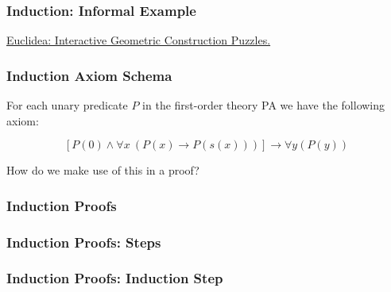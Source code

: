 \documentclass{beamer}
\theoremstyle{indentDefn} \newtheorem{defn}[]{Definition}
\begin{document}
\begin{frame}
	\frametitle{Induction: Informal Example}


	\vspace{75mm}
	\href{https://www.euclidea.xyz/}{Euclidea: Interactive Geometric Construction Puzzles.}
\end{frame}

\begin{frame}
	\frametitle{Induction Axiom Schema}

	For each unary predicate $P$ in the first-order theory PA we have the following axiom: 

	$$[P(0) \land \forall x \ (P(x) \to P(s(x)))] \rightarrow \forall y (P(y))$$

	How do we make use of this in a proof? 

	\vspace{4cm}

\end{frame}

\begin{frame}
	\frametitle{Induction Proofs}


\end{frame}

\begin{frame}
	\frametitle{Induction Proofs: Steps}


\end{frame}

\begin{frame}
	\frametitle{Induction Proofs: Induction Step}



\end{frame}
\end{document}
